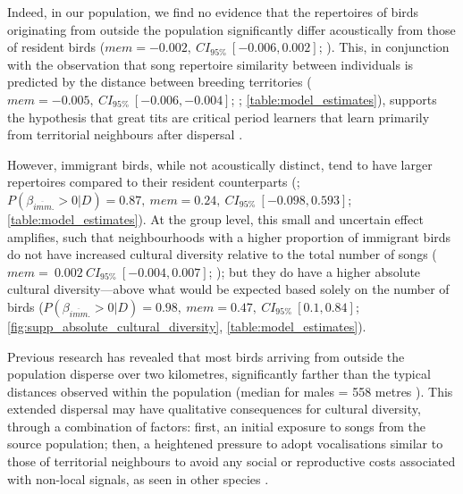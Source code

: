 \documentclass[9pt, onecolumn, twoside, lineno]{gsajnl}
\begin{document}
Indeed, in our population, we find no evidence that the repertoires of birds originating from outside the population significantly differ acoustically from those of resident birds ($mem = -0.002,~CI_{95\%}~[-0.006, 0.002]$; ). This, in conjunction with the observation that song repertoire similarity between individuals is predicted by the distance between breeding territories ($mem = -0.005,~CI_{95\%}~[-0.006, -0.004]$; ; \autoref{table:model_estimates}), supports the hypothesis that great tits are critical period learners that learn primarily from territorial neighbours after dispersal \autocite{mcgregor1982b, rivera-gutierrez2011}.

However, immigrant birds, while not acoustically distinct, tend to have larger repertoires compared to their resident counterparts (; $P(\beta_{\overline{imm}.} > 0 | D) = 0.87,~mem=0.24,~CI_{95\%}~[-0.098, 0.593]$; \autoref{table:model_estimates}). At the group level, this small and uncertain effect amplifies, such that neighbourhoods with a higher proportion of immigrant birds do not have increased cultural diversity relative to the total number of songs ($mem=~0.002~CI_{95\%}~[-0.004, 0.007]$; ); but they do have a higher absolute cultural diversity---above what would be expected based solely on the number of birds ($P(\beta_{\overline{imm}.} > 0 | D) = 0.98,~mem=0.47,~CI_{95\%}~[0.1, 0.84]$; \autoref{fig:supp_absolute_cultural_diversity}, \autoref{table:model_estimates}). 

Previous research \autocite{verhulst1997}  has revealed that most birds arriving from outside the population disperse over two kilometres, significantly farther than the typical distances observed within the population (median for males = 558 metres \autocite{greenwood1979}). This extended dispersal may have qualitative consequences for cultural diversity, through a combination of factors: first, an initial exposure to songs from the source population; then, a heightened pressure to adopt vocalisations similar to those of territorial neighbours to avoid any social or reproductive costs associated with non-local signals, as seen in other species \autocite{payne1983, baker1981, mortega2014, lachlan2014, beecher2008}.
\end{document}
